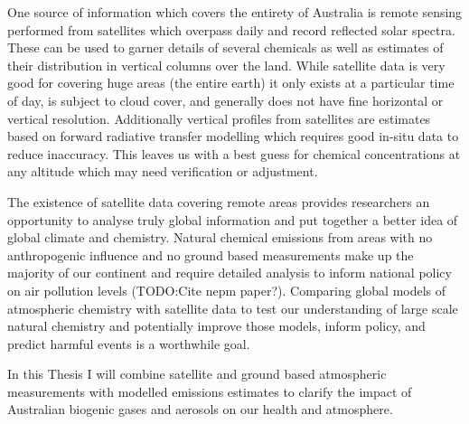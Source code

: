 One source of information which covers the entirety of Australia is remote sensing performed from satellites which overpass daily and record reflected solar spectra.
These can be used to garner details of several chemicals as well as estimates of their distribution in vertical columns over the land.
While satellite data is very good for covering huge areas (the entire earth) it only exists at a particular time of day, is subject to cloud cover, and generally does not have fine horizontal or vertical resolution.
Additionally vertical profiles from satellites are estimates based on forward radiative transfer modelling which requires good in-situ data to reduce inaccuracy.
This leaves us with a best guess for chemical concentrations at any altitude which may need verification or adjustment.

The existence of satellite data covering remote areas provides researchers an opportunity to analyse truly global information and put together a better idea of global climate and chemistry.
Natural chemical emissions from areas with no anthropogenic influence and no ground based measurements make up the majority of our continent \cite{VanDerA_2008} and require detailed analysis to inform national policy on air pollution levels (TODO:Cite nepm paper?).   
Comparing global models of atmospheric chemistry with satellite data to test our understanding of large scale natural chemistry and potentially improve those models, inform policy, and predict harmful events is a worthwhile goal.

In this Thesis I will combine satellite and ground based atmospheric measurements with modelled emissions estimates to clarify the impact of Australian biogenic gases and aerosols on our health and atmosphere.